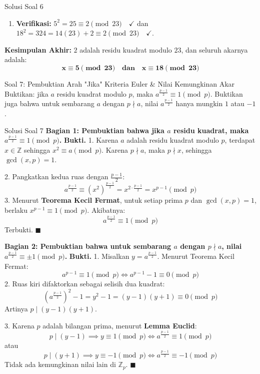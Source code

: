 \documentclass[11pt,a4paper]{article}
\newenvironment{proof}{\noindent\textbf{Bukti.}}{\hfill$\blacksquare$\vspace{0.2em}}
\begin{document}
\begin{solusibox}{Solusi Soal 6}
\begin{enumerate}[leftmargin=*]
    \item \textbf{Verifikasi:}
    $5^2 = 25 \equiv 2 \pmod{23} \quad \checkmark$ dan $18^2 = 324 = 14(23) + 2 \equiv 2 \pmod{23} \quad \checkmark$.
\end{enumerate}

\textbf{Kesimpulan Akhir:} $2$ adalah residu kuadrat modulo $23$, dan seluruh akarnya adalah:
\[
\mathbf{x \equiv 5 \pmod{23} \quad \text{dan} \quad x \equiv 18 \pmod{23}}
\]
\end{solusibox}

\newpage

\begin{soalbox}{Soal 7: Pembuktian Arah "Jika" Kriteria Euler \& Nilai Kemungkinan Akar}
Buktikan: jika $a$ residu kuadrat modulo $p$, maka $a^{\frac{p-1}{2}} \equiv 1 \pmod p$. Buktikan juga bahwa untuk sembarang $a$ dengan $p \nmid a$, nilai $a^{\frac{p-1}{2}}$ hanya mungkin $1$ atau $-1$.
\end{soalbox}

\begin{solusibox}{Solusi Soal 7}
\textbf{Bagian 1: Pembuktian bahwa jika $a$ residu kuadrat, maka $a^{\frac{p-1}{2}} \equiv 1 \pmod p$.}
\begin{proof}
1. Karena $a$ adalah residu kuadrat modulo $p$, terdapat $x \in \mathbb{Z}$ sehingga $x^2 \equiv a \pmod p$.  
Karena $p \nmid a$, maka $p \nmid x$, sehingga $\gcd(x, p) = 1$.

2. Pangkatkan kedua ruas dengan $\frac{p-1}{2}$:
\[
a^{\frac{p-1}{2}} \equiv (x^2)^{\frac{p-1}{2}} = x^{2 \cdot \frac{p-1}{2}} = x^{p-1} \pmod p
\]
3. Menurut \textbf{Teorema Kecil Fermat}, untuk setiap prima $p$ dan $\gcd(x, p) = 1$, berlaku $x^{p-1} \equiv 1 \pmod p$.  
Akibatnya:
\[
a^{\frac{p-1}{2}} \equiv 1 \pmod p
\]
Terbukti.
\end{proof}

\vspace{0.2cm}
\textbf{Bagian 2: Pembuktian bahwa untuk sembarang $a$ dengan $p \nmid a$, nilai $a^{\frac{p-1}{2}} \equiv \pm 1 \pmod p$.}
\begin{proof}
1. Misalkan $y = a^{\frac{p-1}{2}}$. Menurut Teorema Kecil Fermat:
\[
a^{p-1} \equiv 1 \pmod p \iff a^{p-1} - 1 \equiv 0 \pmod p
\]
2. Ruas kiri difaktorkan sebagai selisih dua kuadrat:
\[
\left(a^{\frac{p-1}{2}}\right)^2 - 1 = y^2 - 1 = (y - 1)(y + 1) \equiv 0 \pmod p
\]
Artinya $p \mid (y - 1)(y + 1)$.

3. Karena $p$ adalah bilangan prima, menurut \textbf{Lemma Euclid}:
\[
p \mid (y - 1) \implies y \equiv 1 \pmod p \iff a^{\frac{p-1}{2}} \equiv 1 \pmod p
\]
atau
\[
p \mid (y + 1) \implies y \equiv -1 \pmod p \iff a^{\frac{p-1}{2}} \equiv -1 \pmod p
\]
Tidak ada kemungkinan nilai lain di $\mathbb{Z}_p$.
\end{proof}
\end{solusibox}
\end{document}
